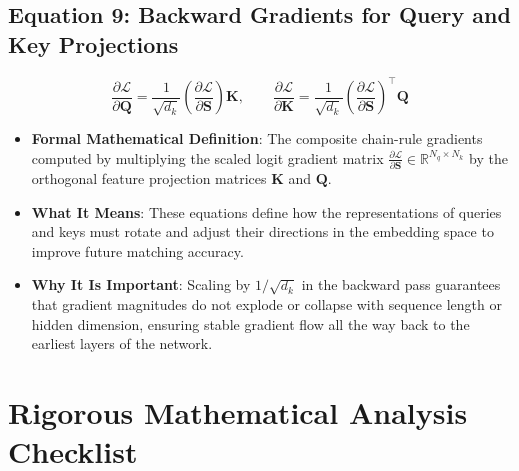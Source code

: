 \documentclass[11pt,a4paper]{article}
\theoremstyle{definition}
\begin{document}
\subsection{\textbf{Equation 9: Backward Gradients for Query and Key Projections}}
{\boldmath
\begin{equation}
\frac{\partial \mathcal{L}}{\partial \mathbf{Q}} = \frac{1}{\sqrt{d_k}} \left(\frac{\partial \mathcal{L}}{\partial \mathbf{S}}\right) \mathbf{K}, \qquad \frac{\partial \mathcal{L}}{\partial \mathbf{K}} = \frac{1}{\sqrt{d_k}} \left(\frac{\partial \mathcal{L}}{\partial \mathbf{S}}\right)^\top \mathbf{Q}
\end{equation}
}
\begin{itemize}
    \item \textbf{Formal Mathematical Definition}:
    The composite chain-rule gradients computed by multiplying the scaled logit gradient matrix $\frac{\partial \mathcal{L}}{\partial \mathbf{S}} \in \mathbb{R}^{N_q \times N_k}$ by the orthogonal feature projection matrices $\mathbf{K}$ and $\mathbf{Q}$.
    \item \textbf{What It Means}:
    These equations define how the representations of queries and keys must rotate and adjust their directions in the embedding space to improve future matching accuracy.
    \item \textbf{Why It Is Important}:
    Scaling by $1/\sqrt{d_k}$ in the backward pass guarantees that gradient magnitudes do not explode or collapse with sequence length or hidden dimension, ensuring stable gradient flow all the way back to the earliest layers of the network.
\end{itemize}

\section{Rigorous Mathematical Analysis Checklist}
\end{document}
